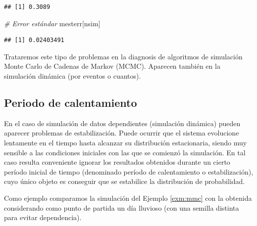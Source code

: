 \documentclass[
]{book}
\newenvironment{Shaded}{\begin{snugshade}}{\end{snugshade}}
\newcommand{\CommentTok}[1]{\textcolor[rgb]{0.56,0.35,0.01}{\textit{#1}}}
\newcommand{\NormalTok}[1]{#1}
\theoremstyle{break}
\theoremstyle{definition}
\theoremstyle{definition}
\theoremstyle{definition}
\theoremstyle{remark}
\begin{document}
\begin{verbatim}
## [1] 0.3089
\end{verbatim}

\begin{Shaded}
\begin{Highlighting}[]
\CommentTok{# Error estándar}
\NormalTok{mesterr[nsim]}
\end{Highlighting}
\end{Shaded}

\begin{verbatim}
## [1] 0.02403491
\end{verbatim}

Trataremos este tipo de problemas en la diagnosis de algoritmos de
simulación Monte Carlo de Cadenas de Markov (MCMC).
Aparecen también en la simulación dinámica (por eventos o cuantos).

\hypertarget{periodo-de-calentamiento}{%
\subsection{Periodo de calentamiento}\label{periodo-de-calentamiento}}

En el caso de simulación de datos dependientes (simulación dinámica)
pueden aparecer problemas de estabilización. Puede ocurrir que el sistema
evolucione lentamente en el tiempo hasta alcanzar su distribución estacionaria,
siendo muy sensible a las condiciones iniciales con las que se comienzó la
simulación. En tal caso resulta conveniente ignorar los resultados obtenidos
durante un cierto período inicial de tiempo (denominado período de calentamiento
o estabilización), cuyo único objeto es conseguir que se estabilice la distribución de
probabilidad.

Como ejemplo comparamos la simulación del Ejemplo \ref{exm:mmc} con la obtenida considerando como punto de partida un día lluvioso (con una semilla distinta para evitar dependencia).
\end{document}
